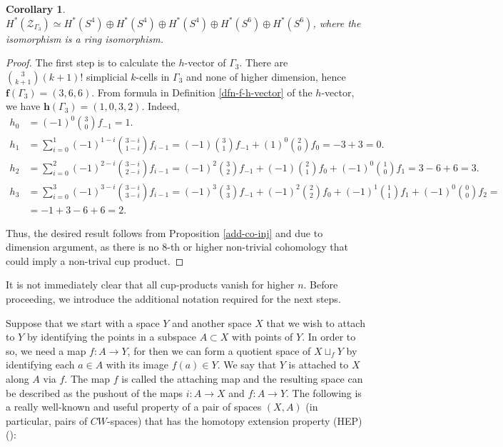 \documentclass[a4paper,11pt]{article}
\newtheorem{corollary}[theorem]{Corollary}
\theoremstyle{definition}
\newcommand{\ZZ}{\mathcal{Z}}
\begin{document}
\begin{corollary}
      $H^*(\ZZ_{\Gamma_3})\simeq H^*(S^4) \oplus H^*(S^4) \oplus H^*(S^4) \oplus H^*(S^6) \oplus H^*(S^6)$, where the isomorphism is a ring isomorphism. %
\end{corollary}
\begin{proof}
    The first step is to calculate the $h$-vector of $\Gamma_3$. There are ${3 \choose k+1}(k+1)!$ simplicial $k$-cells in $\Gamma_3$ and none of higher dimension, hence $\textbf{f}(\Gamma_3) = (3,6,6)$. From formula in Definition \ref{dfn-f-h-vector} of the $h$-vector, we have 
    $\textbf{h}(\Gamma_3) = (1,0,3,2)$. Indeed, 
    \begin{align*}
     h_ 0 & = (-1)^{0} {3 \choose 0}f_{-1} = 1. \\ 
     h_1 & = \sum_{i=0}^{1} (-1)^{1-i} {3-i \choose 1-i}f_{i-1} = (-1) {3 \choose 1}f_{-1} + (1)^0 {2 \choose 0}f_{0} = -3 + 3 = 0. \\ 
     h_2 & = \sum_{i=0}^{2} (-1)^{2-i} {3-i \choose 2-i}f_{i-1} = (-1)^2 {3 \choose 2}f_{-1} + (-1) {2 \choose 1}f_{0} + (-1)^0 {1 \choose 0}f_{1} = 3 - 6 + 6 = 3. \\ 
     h_3 & = \sum_{i=0}^{3} (-1)^{3-i} {3-i \choose 3-i}f_{i-1} = (-1)^3 {3 \choose 3}f_{-1} + (-1)^2 {2 \choose 2}f_{0} + (-1)^1 {1 \choose 1}f_{1} + (-1)^0 {0 \choose 0}f_{2} = \\ &  = -1 + 3 - 6 + 6 = 2.
    \end{align*}
    
     Thus, the desired result follows from Proposition \ref{add-co-inj} and due to dimension argument, as there is no $8$-th or higher non-trivial cohomology that could imply a non-trival cup product.
\end{proof}

It is not immediately clear that all cup-products vanish for higher $n$. Before proceeding, we introduce the additional notation required for the next steps.

Suppose that we start with a space $Y$ and another space $X$ that we wish to attach to $Y$ by identifying the points in a subspace $A \subset X$ with points of $Y$. In order to so, we need a map $f: A \to Y$, for then we can form a quotient space of $X \sqcup_f Y$ by identifying each $a \in A$ with its image $f(a) \in Y$. We say that $Y$ is attached to $X$ along $A$ via $f$. The map $f$ is called the attaching map and the resulting space can be described as the pushout of the maps $i: A \to X$ and $f:A \to Y$. The following is a really well-known and useful property of a pair of spaces $(X,A)$ (in particular, pairs of $CW$-spaces) that has the homotopy extension property (HEP) (\cite[Chapter~0]{Hatcher}):
\end{document}

